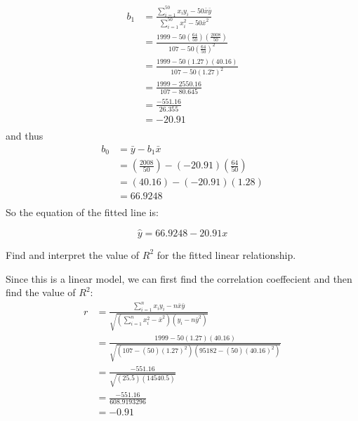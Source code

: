 \documentclass{examsetup}\usepackage[]{graphicx}\usepackage[]{color}
\begin{document}
\begin{questions}
\begin{parts}
\begin{subparts}
\begin{solution}
         \begin{align*}
            b_1 &= \frac{\sum_{i=1}^{50} x_i y_i - 50 \bar{x} \bar{y}}{\sum_{i=1}^{50} x_i^2 - 50 \bar{x}^2} \\
                &=  \frac{ 1999 - 50 \left(\frac{64}{50}\right) \left(\frac{2008}{50}\right) }{ 107- 50 \left(\frac{64}{50}\right)^2 } \\
                &=  \frac{ 1999 - 50 (1.27) (40.16) }{ 107- 50 (1.27)^2 } \\
                &=  \frac{ 1999 - 2550.16 }{ 107- 80.645 } \\
             &= \frac{ \ensuremath{-551.16} }{ 26.355 } \\
             &= \ensuremath{-20.91} \\
         \end{align*}
         and thus 
         \begin{align*}
            b_0 &= \bar{y} - b_1 \bar{x} \\
                &= \left(\frac{2008}{50}\right) - (\ensuremath{-20.91} ) \left(\frac{64}{50}\right) \\
                &= \left(40.16\right) - (\ensuremath{-20.91} ) \left(1.28\right) \\
                &= 66.9248 \\
         \end{align*}
         So the equation of the fitted line is:

         $$
         \hat{y} = 66.9248 - 20.91 x 
         $$

      \end{solution} 
      \subpart[5] Find and interpret the value of $R^2$ for the fitted linear relationship.
      \begin{solution}
         Since this is a linear model, we can first find the correlation coeffecient and then find the value of $R^2$:
         \begin{align*}
         r 
         &= 
         \frac{
            \sum_{i=1}^n x_i y_i - n \bar{x} \bar{y}
         }{
            \sqrt{\left(\sum_{i=1}^n x_i^2 - \bar{x}^2 \right) \left(y_i - n \bar{y}^2 \right)}
         }\\
         &= 
         \frac{
            1999 - 50 (1.27)(40.16)
         }{
            \sqrt{\left(107 - (50)( 1.27)^2 \right)
            \left(95182 - (50)( 40.16)^2 \right)}
         }\\
         &= 
         \frac{
            \ensuremath{-551.16}
         }{
            \sqrt{\left(25.5 \right)
            \left(14540.5 \right)}
         }\\
         &= 
         \frac{
            \ensuremath{-551.16}
         }{
            608.9193296
         }
         \\
         &= \ensuremath{-0.91}
         \end{align*}


\end{solution}
\end{subparts}
\end{parts}
\end{questions}
\end{document}
